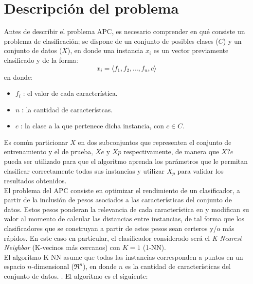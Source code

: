 \documentclass{ci5652}
\begin{document}

\section{Descripción del problema}

Antes de describir el problema APC, es necesario comprender en qué consiste
un problema de clasificación; se dispone de un conjunto de posibles clases
($C$) y un conjunto de datos ($X$), en donde una instancia $x_i$ es un vector
previamente clasificado y de la forma:
$$x_i = \langle f_1, f_2, \dots, f_n, c\rangle $$ en donde:

\begin{itemize}
  \item $f_i$ : el valor de cada característica.
  \item $n$ : la cantidad de característcas.
  \item $c$ : la clase a la que pertenece dicha instancia, con $c \in C$.
\end{itemize}

Es común particionar $X$ en dos subconjuntos que representen el conjunto de
entrenamiento y el de prueba, $Xe$ y $Xp$ respectivamente, de manera que $X?e$
pueda ser utilizado para que el algoritmo aprenda los parámetros que le
permitan clasificar correctamente todas sus instancias y utilizar $X_p$ para
validar los resultados obtenidos.\\

El problema del APC consiste en optimizar el rendimiento de un clasificador, a
partir de la inclusión de pesos asociados a las características del conjunto de
datos. Estos pesos ponderan la relevancia de cada característica en y modifican
su valor al momento de calcular las distancias entre instancias, de tal forma 
que los clasificadores que se construyan a partir de estos pesos sean certeros 
y/o más rápidos. En este caso en particular, el clasificador considerado será el
\textit{K-Nearest Neighbor} (K-vecinos más cercanos) con $K=1$ (1-NN).\\

El algoritmo K-NN asume que todas las instancias corresponden a puntos en un
espacio $n$-dimensional ($\Re^n$), en donde $n$ es la cantidad de
características del conjunto de datos. \cite{Mitchell_1997}. El algoritmo es el
siguiente:
\end{document}
